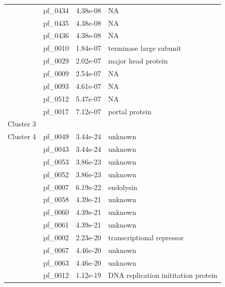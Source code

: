 \begin{table}
\begin{lrbox}{\leftbox}
\begin{tabular}[t]{llll}
                                        & pf\_0434 & 4.38e-08 & NA \\ 
                                        & pf\_0435 & 4.38e-08 & NA \\ 
                                        & pf\_0436 & 4.38e-08 & NA \\ 
                                        & pf\_0010 & 1.84e-07 & terminase large subunit \\ 
                                        & pf\_0029 & 2.02e-07 & major head protein \\ 
                                        & pf\_0009 & 2.54e-07 & NA \\ 
                                        & pf\_0093 & 4.61e-07 & NA \\ 
                                        & pf\_0512 & 5.47e-07 & NA \\ 
                                        & pf\_0017 & 7.12e-07 & portal protein \\ 
            \midrule
            Cluster 3 & & & \\
            \midrule
            \multirow{1}{*}{Cluster 4} & pf\_0049 & 3.44e-24 & unknown \\ 
                                        & pf\_0043 & 3.44e-24 & unknown \\ 
                                        & pf\_0053 & 3.86e-23 & unknown \\ 
                                        & pf\_0052 & 3.86e-23 & unknown \\ 
                                        & pf\_0007 & 6.19e-22 & endolysin \\ 
                                        & pf\_0058 & 4.39e-21 & unknown \\ 
                                        & pf\_0060 & 4.39e-21 & unknown \\ 
                                        & pf\_0061 & 4.39e-21 & unknown \\ 
                                        & pf\_0002 & 2.23e-20 & transcriptional repressor \\ 
                                        & pf\_0067 & 4.46e-20 & unknown \\ 
                                        & pf\_0063 & 4.46e-20 & unknown \\ 
                                        & pf\_0012 & 1.12e-19 & DNA replication inititation protein \\ 

\end{tabular}
\end{lrbox}
\end{table}

